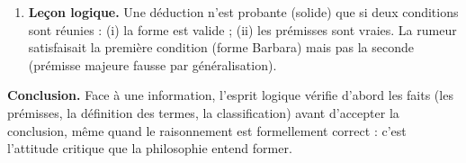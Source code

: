\documentclass[11pt]{article}
\begin{document}
\begin{exoresolu}
\begin{enumerate}
\begin{itemize}
  \item Pour conclure, il faut savoir : « La sortie au barrage est-elle encadrée ? » (B est S' ou B n'est pas S').
  \end{itemize}
\item \textbf{Leçon logique.} Une déduction n'est probante (solide) que si deux conditions sont réunies : (i) la forme est valide ; (ii) les prémisses sont vraies. La rumeur satisfaisait la première condition (forme Barbara) mais pas la seconde (prémisse majeure fausse par généralisation).
\end{enumerate}
\textbf{Conclusion.} Face à une information, l'esprit logique vérifie d'abord les faits (les prémisses, la définition des termes, la classification) avant d'accepter la conclusion, même quand le raisonnement est formellement correct : c'est l'attitude critique que la philosophie entend former.
\end{exoresolu}
\end{document}
